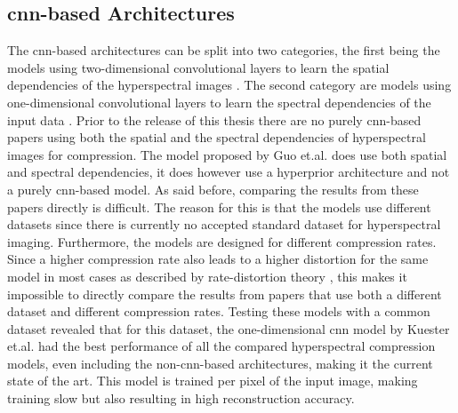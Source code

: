 \subsection{\Ac{cnn}-based Architectures}
The \ac{cnn}-based architectures can be split into two categories, the first being the models using two-dimensional convolutional layers to learn the spatial dependencies of the hyperspectral images \citep{la_grassa_hyperspectral_2022}. The second category are models using one-dimensional convolutional layers to learn the spectral dependencies of the input data \citep{kuester_1d-convolutional_2021}\citep{kuester_transferability_2022}. Prior to the release of this thesis there are no purely \ac{cnn}-based papers using both the spatial and the spectral dependencies of hyperspectral images for compression. The model proposed by Guo et.al. \citep{guo_learned_2021} does use both spatial and spectral dependencies, it does however use a hyperprior architecture and not a purely \ac{cnn}-based model.
As said before, comparing the results from these papers directly is difficult. The reason for this is that the models use different datasets since there is currently no accepted standard dataset for hyperspectral imaging. Furthermore, the models are designed for different compression rates. Since a higher compression rate also leads to a higher distortion for the same model in most cases as described by rate-distortion theory \citep{berger_rate-distortion_2003}, this makes it impossible to directly compare the results from papers that use both a different dataset and different compression rates.
Testing these models with a common dataset revealed that for this dataset, the one-dimensional \ac{cnn} model by Kuester et.al. \citep{kuester_1d-convolutional_2021} had the best performance of all the compared hyperspectral compression models, even including the non-\ac{cnn}-based architectures, making it the current state of the art. This model is trained per pixel of the input image, making training slow but also resulting in high reconstruction accuracy.
